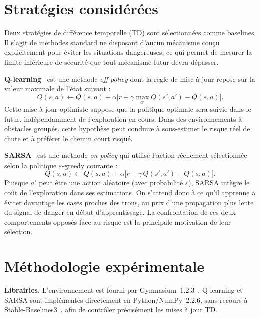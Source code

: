 \documentclass{article}
\begin{document}
\section{Stratégies considérées}

Deux stratégies de différence temporelle (TD) sont sélectionnées comme baselines. Il s'agit de méthodes standard ne disposant d'aucun mécanisme conçu explicitement pour éviter les situations dangereuses, ce qui permet de mesurer la limite inférieure de sécurité que tout mécanisme futur devra dépasser.

\textbf{Q-learning}~\citep{watkins1992} est une méthode \textit{off-policy} dont la règle de mise à jour repose sur la valeur maximale de l'état suivant :
\begin{equation}
  Q(s, a) \leftarrow Q(s, a) + \alpha \bigl[r + \gamma \max_{a'} Q(s', a') - Q(s, a)\bigr].
\end{equation}
Cette mise à jour optimiste suppose que la politique optimale sera suivie dans le futur, indépendamment de l'exploration en cours. Dans des environnements à obstacles groupés, cette hypothèse peut conduire à sous-estimer le risque réel de chute et à préférer le chemin court risqué.

\textbf{SARSA}~\citep{rummery1994} est une méthode \textit{on-policy} qui utilise l'action réellement sélectionnée selon la politique $\varepsilon$-greedy courante :
\begin{equation}
  Q(s, a) \leftarrow Q(s, a) + \alpha \bigl[r + \gamma\, Q(s', a') - Q(s, a)\bigr].
\end{equation}
Puisque $a'$ peut être une action aléatoire (avec probabilité $\varepsilon$), SARSA intègre le coût de l'exploration dans ses estimations. On s'attend donc à ce qu'il apprenne à éviter davantage les cases proches des trous, au prix d'une propagation plus lente du signal de danger en début d'apprentissage. La confrontation de ces deux comportements opposés face au risque est la principale motivation de leur sélection.


\section{Méthodologie expérimentale}

\textbf{Librairies.} L'environnement est fourni par Gymnasium~1.2.3~\citep{towers2024}. Q-learning et SARSA sont implémentés directement en Python/NumPy~2.2.6, sans recours à Stable-Baselines3~\citep{raffin2021}, afin de contrôler précisément les mises à jour TD.
\end{document}
